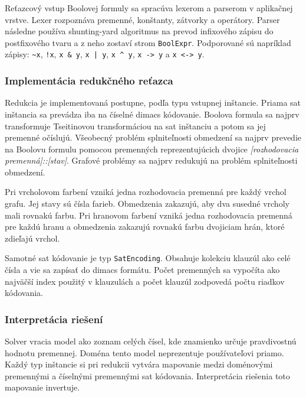 Reťazcový vstup Boolovej formuly sa spracúva lexerom a parserom v aplikačnej vrstve. Lexer rozpoznáva premenné, konštanty, zátvorky a operátory. Parser následne používa shunting-yard algoritmus na prevod infixového zápisu do postfixového tvaru \cite{dijkstra1961algol60translation,mit6087lecture7} a z neho zostaví strom \texttt{BoolExpr}. Podporované sú napríklad zápisy: \texttt{\textasciitilde{}x}, \texttt{!x}, \texttt{x \& y}, \texttt{x | y}, \texttt{x \textasciicircum{} y}, \texttt{x -> y} a \texttt{x <-> y}.

\subsubsection{Implementácia redukčného reťazca}\label{sec:implementation:reduction-chain}
Redukcia je implementovaná postupne, podľa typu vstupnej inštancie. Priama \acrshort{sat} inštancia sa prevádza iba na číselné \acrshort{dimacs} kódovanie. Boolova formula sa najprv transformuje Tseitinovou transformáciou na \acrshort{sat} inštanciu a potom sa jej premenné očíslujú. Všeobecný problém splniteľnosti obmedzení sa najprv prevedie na Boolovu formulu pomocou premenných reprezentujúcich dvojice \textit{[rozhodovacia premenná]::[stav]}. Grafové problémy sa najprv redukujú na problém splniteľnosti obmedzení.

Pri vrcholovom farbení vzniká jedna rozhodovacia premenná pre každý vrchol grafu. Jej stavy sú čísla farieb. Obmedzenia zakazujú, aby dva susedné vrcholy mali rovnakú farbu. Pri hranovom farbení vzniká jedna rozhodovacia premenná pre každú hranu a obmedzenia zakazujú rovnakú farbu dvojiciam hrán, ktoré zdieľajú vrchol.

Samotné \acrshort{sat} kódovanie je typ \texttt{SatEncoding}. Obsahuje kolekciu klauzúl ako celé čísla a vie sa zapísať do \acrshort{dimacs} formátu. Počet premenných sa vypočíta ako najväčší index použitý v klauzulách a počet klauzúl zodpovedá počtu riadkov kódovania.

\subsubsection{Interpretácia riešení}\label{sec:implementation:solution-interpretation}
Solver vracia model ako zoznam celých čísel, kde znamienko určuje pravdivostnú hodnotu premennej. Doména tento model neprezentuje používateľovi priamo. Každý typ inštancie si pri redukcii vytvára mapovanie medzi doménovými premennými a číselnými premennými \acrshort{sat} kódovania. Interpretácia riešenia toto mapovanie invertuje.

